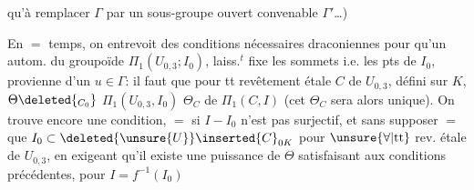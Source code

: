 qu'à remplacer $\Gamma$ par un sous-groupe ouvert convenable $\Gamma'$\ldots)

En $=$ temps, on entrevoit des conditions nécessaires draconiennes pour qu'un autom. \inserted{$\Theta$} du groupoïde $\Pi_1(U_{0,3};I_0)$, laiss.$^t$ fixe les sommets i.e. les pts de $I_0$, provienne d'un $u\in\Gamma$: il faut que pour tt revêtement  étale $C$ de $U_{0,3}$, défini sur $K$,      $\Theta\deleted{_{C_0}}$  $\Pi_1(U_{0,3},I_0)$   $\Theta_C$ de $\Pi_1(C,I)$     (cet $\Theta_C$ sera alors unique). On trouve encore une condition, $=$ si $I-I_0$ n'est pas surjectif, et sans supposer $=$ que $I_0\subset \deleted{\unsure{U}}\inserted{C}_{0K}$ pour $\unsure{\forall|\mathrm{tt}}$ rev. étale de $U_{0,3}$, en exigeant qu'il existe une puissance  de $\Theta$  satisfaisant aux conditions précédentes, pour $I=f^{-1}(I_0)$ 

